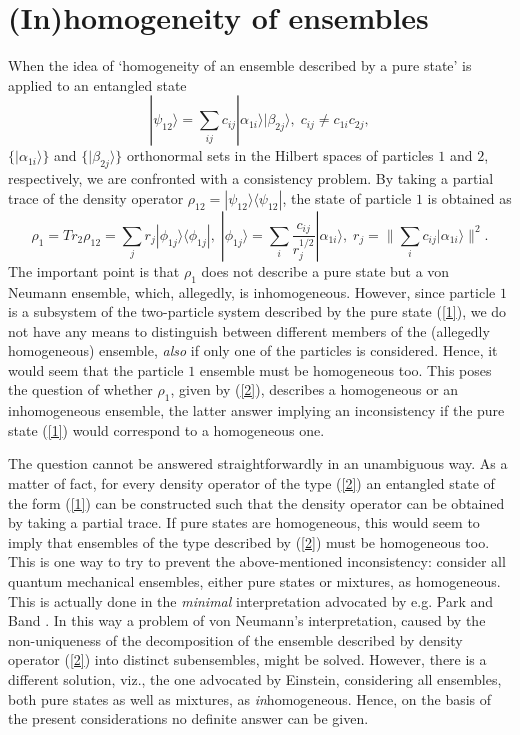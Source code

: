 \documentclass[12pt]{article}
\begin{document}
\section{(In)homogeneity of ensembles}\label{sec2.3}
When the idea of `homogeneity of an ensemble
described by a pure state' is applied to an entangled state
\begin{equation}
| \psi_{12} \rangle = \sum_{ij} c_{ij} | \alpha_{1i} \rangle |
\beta_{2j} \rangle,\;c_{ij}\neq c_{1i}c_{2j}, \label{1}
\end{equation}
$\{| \alpha_{1i} \rangle\} $ and $\{| \beta_{2j} \rangle\} $
orthonormal sets in the Hilbert spaces of particles $1$ and $2$,
respectively, we are confronted with a consistency problem. By
taking a partial trace of the density operator $\rho_{12} =|
\psi_{12} \rangle\langle  \psi_{12}|$, the state of particle $1$
is obtained as
\begin{equation}
\rho_1=Tr_2  \rho_{12} =  \sum_ j r_j |\phi_{1j} \rangle\langle
\phi_{1j}|, \;|\phi_{1j} \rangle = \sum_i
\frac{c_{ij}}{r_j^{1/2}}|\alpha_{1i}\rangle, \; r_j =\|\sum_i
c_{ij}|\alpha_{1i}\rangle\|^2.\label{2}
\end{equation}
The important point is that $\rho_1$ does not describe a pure
state but a von Neumann ensemble, which, allegedly, is
inhomogeneous. However, since particle $1$ is a subsystem of the
two-particle system described by the pure state (\ref{1}), we do
not have any means to distinguish between different members of the
(allegedly homogeneous) ensemble, {\em also} if only one of the
particles is considered. Hence, it would seem that the particle
$1$ ensemble must be homogeneous too.  This poses the question of
whether $\rho_1$, given by (\ref{2}), describes a homogeneous or
an inhomogeneous ensemble, the latter answer implying an
inconsistency if the pure state (\ref{1}) would correspond to a
homogeneous one.

The question cannot be answered straightforwardly in an
unambiguous way. As a matter of fact, for every density operator
of the type (\ref{2}) an entangled state of the form (\ref{1}) can
be constructed such that the density operator can be obtained by
taking a partial trace. If pure states are homogeneous, this would
seem to imply that ensembles of the type described by (\ref{2})
must be homogeneous too. This is one way to try to prevent the
above-mentioned inconsistency: consider all quantum mechanical
ensembles, either pure states or mixtures, as homogeneous. This is
actually done in the {\em minimal} interpretation advocated by
e.g. Park and Band \cite{Park73,BaPa76}. In this way a problem of
von Neumann's interpretation, caused by the non-uniqueness of the
decomposition of the ensemble described by density operator
(\ref{2}) into distinct subensembles,
might be solved. However, there is a different solution, viz., the
one advocated by Einstein, considering all ensembles, both pure
states as well as mixtures, as {\em in}homogeneous. Hence, on the
basis of the present considerations no definite answer can be
given.
\end{document}

